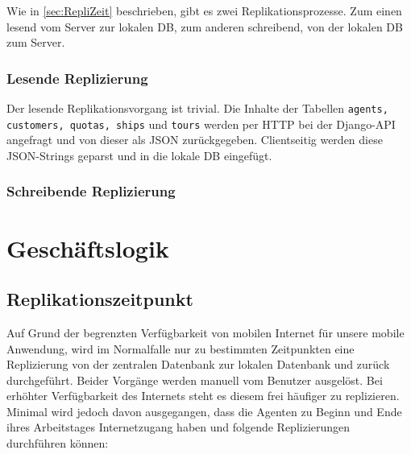 \documentclass[12pt,a4paper,ngerman,english]{report}
\begin{document}
Wie in \autoref{sec:RepliZeit} beschrieben, gibt es zwei Replikationsprozesse. Zum einen lesend vom Server zur lokalen DB, zum anderen schreibend, von der lokalen DB zum Server.

\subsection{Lesende Replizierung}

Der lesende Replikationsvorgang ist trivial. Die Inhalte der Tabellen \texttt{agents, customers, quotas, ships} und \texttt{tours} werden per HTTP bei der Django-API angefragt und von dieser als JSON zurückgegeben. Clientseitig werden diese JSON-Strings geparst und in die lokale DB eingefügt.

\subsection{Schreibende Replizierung}

\chapter{Geschäftslogik}

\section{Replikationszeitpunkt}
\label{sec:RepliZeit}

Auf Grund der begrenzten Verfügbarkeit von mobilen Internet für unsere mobile Anwendung, wird im Normalfalle nur zu bestimmten Zeitpunkten eine Replizierung von der zentralen Datenbank zur lokalen Datenbank und zurück durchgeführt. Beider Vorgänge werden manuell vom Benutzer ausgelöst. Bei erhöhter Verfügbarkeit des Internets steht es diesem frei häufiger zu replizieren. Minimal wird jedoch davon ausgegangen, dass die Agenten zu Beginn und Ende ihres Arbeitstages Internetzugang haben und folgende Replizierungen durchführen können:
\end{document}
